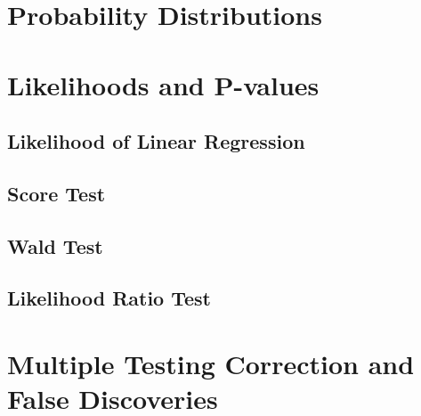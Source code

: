 \documentclass{pset}
\date{6/1/2025}
\begin{document}
\maketitle

\section{Probability Distributions}

\subsection{}

\subsection{}

\subsection{}


\section{Likelihoods and P-values}

\subsection{Likelihood of Linear Regression}


\subsection{Score Test}


\subsection{Wald Test}


\subsection{Likelihood Ratio Test}


\subsection{}


\section{Multiple Testing Correction and False Discoveries}
\end{document}
